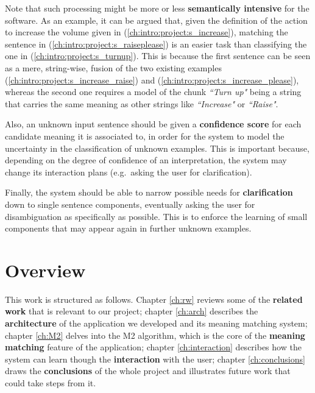 Note that such processing might be more or less \textbf{semantically intensive} for the software. As an example, it can be argued that, given the definition of the action to increase the volume given in (\ref{ch:intro:project:s_increase}), matching the sentence in (\ref{ch:intro:project:s_raiseplease}) is an easier task than classifying the one in (\ref{ch:intro:project:s_turnup}).
 \label{ch:intro:project:s_raiseplease}
\vspace{-0.7cm}
 \label{ch:intro:project:s_turnup}
This is because the first sentence can be seen as a mere, string-wise, fusion of the two existing examples (\ref{ch:intro:project:s_increase_raise}) and (\ref{ch:intro:project:s_increase_please}), whereas the second one requires a model of the chunk \textit{``Turn up"} being a string that carries the same meaning as other strings like \textit{``Increase"} or \textit{``Raise"}.

Also, an unknown input sentence should be given a \textbf{confidence score} for each candidate meaning it is associated to, in order for the system to model the uncertainty in the classification of unknown examples. This is important because, depending on the degree of confidence of an interpretation, the system may change its interaction plans (e.g.\ asking the user for clarification).

Finally, the system should be able to narrow possible needs for \textbf{clarification} down to single sentence components, eventually asking the user for disambiguation as specifically as possible. This is to enforce the learning of small components that may appear again in further unknown examples.

\section{Overview}

This work is structured as follows. Chapter \ref{ch:rw} reviews some of the \textbf{related work} that is relevant to our project; chapter \ref{ch:arch} describes the \textbf{architecture} of the application we developed and its meaning matching system; chapter \ref{ch:M2} delves into the M2 algorithm, which is the core of the \textbf{meaning matching} feature of the application; chapter \ref{ch:interaction} describes how the system can learn though the \textbf{interaction} with the user; chapter \ref{ch:conclusions} draws the \textbf{conclusions} of the whole project and illustrates future work that could take steps from it.
